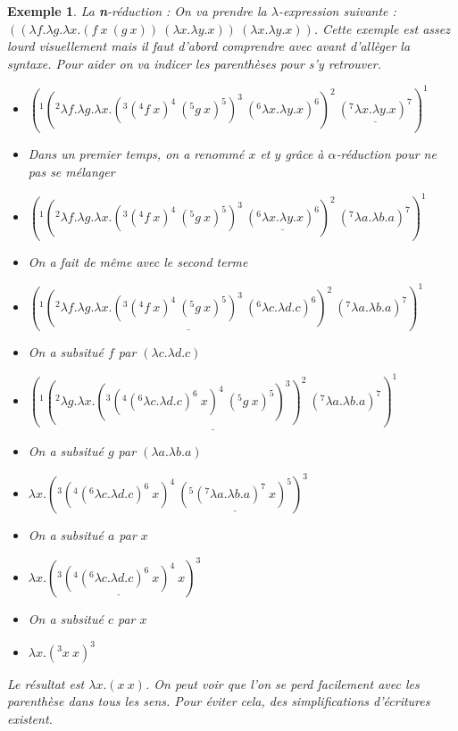 \documentclass[10pt,a4paper]{report}
\newtheorem{ex}{Exemple}
\begin{document}
	\begin{ex}
		La \textbf{n}-réduction : On va prendre la $\lambda$-expression suivante : $((\lambda f.\lambda g.\lambda x.(f~x~(g~x))~(\lambda x.\lambda y.x))~(\lambda x.\lambda y.x))$. Cette exemple est assez lourd visuellement mais il faut d'abord comprendre avec avant d'allèger la syntaxe. Pour aider on va indicer les parenthèses pour s'y retrouver. 
		\smallbreak
		
		\begin{itemize}
			\item[] $(^{1}(^{2}\lambda f.\lambda g.\lambda x.(^{3}(^{4}f~x)^{4}~(^{5}g~x)^{5})^{3}~(^{6}\lambda x.\lambda y.x)^{6})^{2}~\underline{(^{7}\lambda x.\lambda y.x)^{7}})^{1}$
			\item[] Dans un premier temps, on a renommé $x$ et $y$ grâce à $\alpha$-réduction pour ne pas se mélanger
			\item[$\rightarrow^{\alpha}_{\textbf{n}}$] $(^{1}(^{2}\lambda f.\lambda g.\lambda x.(^{3}(^{4}f~x)^{4}~(^{5}g~x)^{5})^{3}~\underline{(^{6}\lambda x.\lambda y.x)^{6}})^{2}~(^{7}\lambda a.\lambda b.a)^{7})^{1}$
			
			\item[] On a fait de même avec le second terme
			\item[$\rightarrow^{\alpha}_{\textbf{n}}$] $(^{1}\underline{(^{2}\lambda f.\lambda g.\lambda x.(^{3}(^{4}f~x)^{4}~(^{5}g~x)^{5})^{3}~(^{6}\lambda c.\lambda d.c)^{6})^{2}}~(^{7}\lambda a.\lambda b.a)^{7})^{1}$
			
			\item[] On a subsitué $f$ par $(\lambda c.\lambda d.c)$
			\item[$\rightarrow^{\beta}_{\textbf{n}}$] $\underline{(^{1}(^{2}\lambda g.\lambda x.(^{3}(^{4}(^{6}\lambda c.\lambda d.c)^{6}~x)^{4}~(^{5}g~x)^{5})^{3})^{2}~(^{7}\lambda a.\lambda b.a)^{7})^{1}}$
			
			\item[] On a subsitué $g$ par $(\lambda a.\lambda b.a)$
			\item[$\rightarrow^{\beta}_{\textbf{n}}$] $\lambda x.(^{3}(^{4}(^{6}\lambda c.\lambda d.c)^{6}~x)^{4}~\underline{(^{5}(^{7}\lambda a.\lambda b.a)^{7}~x)^{5}})^{3}$
			
			\item[] On a subsitué $a$ par $x$
			\item[$\rightarrow^{\beta}_{\textbf{n}}$] $\lambda x.(^{3}\underline{(^{4}(^{6}\lambda c.\lambda d.c)^{6}~x)^{4}}~x)^{3}$
			
			\item[] On a subsitué $c$ par $x$
			\item[$\rightarrow^{\beta}_{\textbf{n}}$] $\lambda x.(^{3}x~x)^{3}$
		\end{itemize}
		\bigbreak
		
		Le résultat est $\lambda x.(x~x)$. On peut voir que l'on se perd facilement avec les parenthèse dans tous les sens. Pour éviter cela, des simplifications d'écritures existent.
	\end{ex}
	
\end{document}
